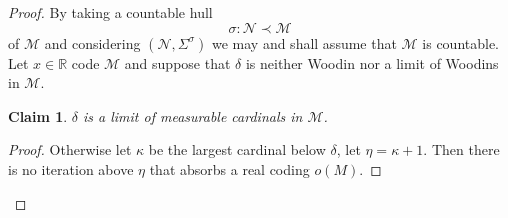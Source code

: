 \documentclass[12pt,a4paper]{article}
\theoremstyle{nicestyle}
\newtheorem*{claim*}{Claim}
\newenvironment{proofblack}{\begin{proof}}
  {\renewcommand{\qedsymbol}{$\blacksquare$}\end{proof}}
\begin{document}
\begin{proof}
  By taking a countable hull
  \[
    \sigma \colon \mathcal{N} \prec \mathcal{M}
  \]
  of $\mathcal{M}$ and considering $(\mathcal{N}, \Sigma^{\sigma})$ we
  may and shall assume that $\mathcal{M}$ is countable. Let
  $x \in \mathbb{R}$ code $\mathcal{M}$ and suppose that $\delta$ is
  neither Woodin nor a limit of Woodins in $\mathcal{M}$.

  \begin{claim*}
    $\delta$ is a limit of measurable cardinals in $\mathcal{M}$.
  \end{claim*}

  \begin{proofblack}
    Otherwise let $\kappa$ be the largest cardinal below $\delta$, let
    $\eta = \kappa + 1$. Then there is no iteration above $\eta$ that
    absorbs a real coding $o(M)$.
  \end{proofblack}


\end{proof}
\end{document}
